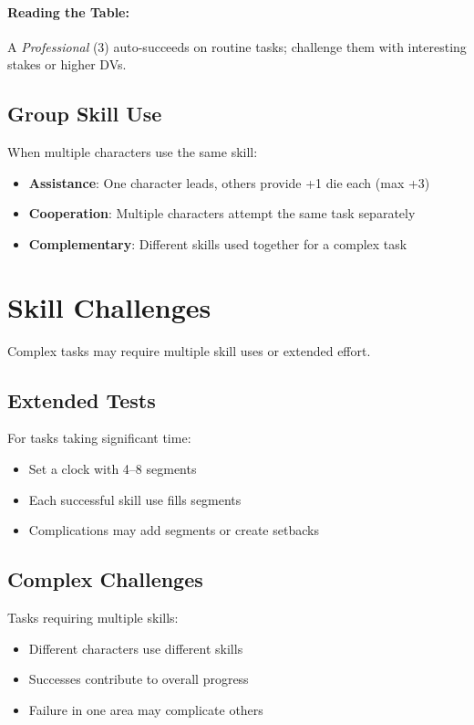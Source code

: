 \paragraph{Reading the Table:}
A \emph{Professional} (3) auto-succeeds on routine tasks; challenge them with interesting stakes or higher DVs.

\subsection*{Group Skill Use}
When multiple characters use the same skill:
\begin{itemize}
\item \textbf{Assistance}: One character leads, others provide +1 die each (max +3)
\item \textbf{Cooperation}: Multiple characters attempt the same task separately
\item \textbf{Complementary}: Different skills used together for a complex task
\end{itemize}

\section{Skill Challenges}

Complex tasks may require multiple skill uses or extended effort.

\subsection*{Extended Tests}
For tasks taking significant time:
\begin{itemize}
\item Set a clock with 4--8 segments
\item Each successful skill use fills segments
\item Complications may add segments or create setbacks
\end{itemize}

\subsection*{Complex Challenges}
Tasks requiring multiple skills:
\begin{itemize}
\item Different characters use different skills
\item Successes contribute to overall progress
\item Failure in one area may complicate others
\end{itemize}

